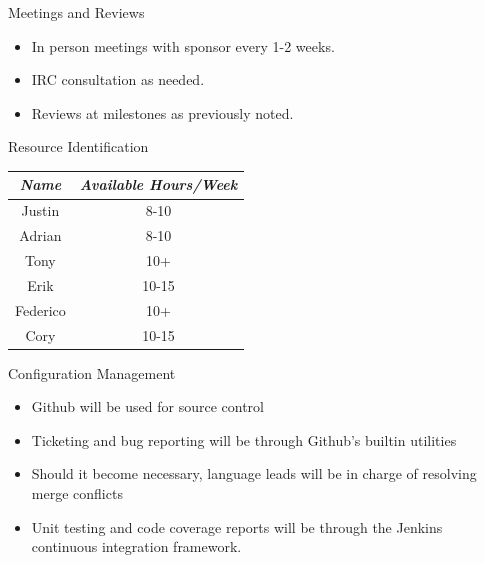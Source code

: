 \documentclass{beamer}
\begin{document}
\begin{frame}{Meetings and Reviews}
  \begin{itemize}
  \item In person meetings with sponsor every 1-2 weeks.
  \item IRC consultation as needed.
  \item Reviews at milestones as previously noted.
  \end{itemize}
\end{frame}

\begin{frame}{Resource Identification}
  \begin{center}
    \begin{tabular}{|c|c|}
      \hline
      \emph{Name} & \emph{Available Hours/Week}\\ \hline \hline
      Justin & 8-10\\ \hline
      Adrian & 8-10\\ \hline
      Tony & 10+\\ \hline
      Erik & 10-15\\ \hline
      Federico & 10+\\ \hline
      Cory & 10-15 \\
      \hline
    \end{tabular}
  \end{center}
\end{frame}

\begin{frame}{Configuration Management}
  \begin{itemize}
  \item Github will be used for source control
  \item Ticketing and bug reporting will be through Github's builtin utilities
  \item Should it become necessary, language leads will be in charge of resolving merge conflicts
  \item Unit testing and code coverage reports will be through the Jenkins continuous integration framework.
  \end{itemize}
\end{frame}
\end{document}
